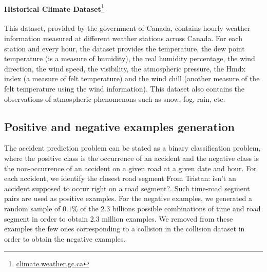 \documentclass[conference]{IEEEtran}
\newcommand{\TG}[1]{\colorlet{saved}{.}\color{orange}From Tristan: #1\color{saved}}
\begin{document}
\paragraph{Historical Climate Dataset\protect\footnote{\url{climate.weather.gc.ca}}}

This dataset, provided by the government of Canada, contains hourly weather
information measured at different weather stations across Canada. For each
station and every hour, the dataset provides the temperature, the dew point
temperature (is a measure of humidity), the real humidity percentage,
the wind direction, the wind speed, the visibility, the atmospheric pressure,
the Hmdx index (a measure of felt temperature) and the wind chill 
 (another measure of the felt temperature using the wind information).
This dataset also contains the observations of atmospheric phenomenons such
as snow, fog, rain, etc.

\subsection{Positive and negative examples generation}

The accident prediction problem can be stated as a binary classification
problem, where the positive class is the occurrence of an accident and the
negative class is the non-occurrence of an accident on a given road at a
given date and hour. For each accident, we identify the
closest road segment \TG{isn't an accident supposed to occur right on a road segment?}. Such time-road segment pairs are used as
positive examples. For the negative examples, we generated a random sample
of $0.1\%$ of the 2.3 billions possible combinations of time and road segment
in order to obtain 2.3 million examples. We removed from these examples the few
ones corresponding to a collision in the collision dataset in order to obtain
the negative examples.
\end{document}
